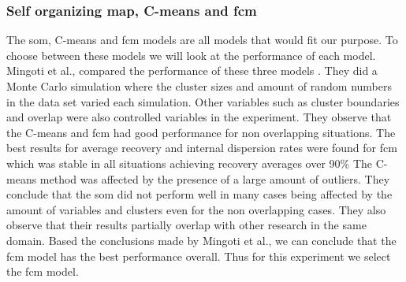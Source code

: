 \documentclass[../../main]{subfiles}
\begin{document}
\subsubsection{Self organizing map, C-means and \acrlong{fcm}}
\label{ch:topThreeModels}
The \acrfull{som}, C-means and \acrfull{fcm} models are all models that would fit our purpose. 
To choose between these models we will look at the performance of each model.
Mingoti et al., compared the performance of these three models \cite{Mingoti2006ComparingAlgorithms}.
They did a Monte Carlo simulation where the cluster sizes and amount of random numbers in the data set varied each simulation\cite{Mingoti2006ComparingAlgorithms}.
Other variables such as cluster boundaries and overlap were also controlled variables in the experiment.
They observe that the C-means and \acrlong{fcm} had good performance for non overlapping situations\cite{Mingoti2006ComparingAlgorithms}.
The best results for average recovery and internal dispersion rates were found for \acrlong{fcm} which was stable in all situations achieving recovery averages over 90\%\cite{Mingoti2006ComparingAlgorithms}
The C-means method was affected by the presence of a large amount of outliers.
They conclude that the \acrshort{som} did not perform well in many cases being affected by the amount of variables and clusters even for the non overlapping cases\cite{Mingoti2006ComparingAlgorithms}.
They also observe  that their results partially overlap with other research in the same domain.
\newline
Based the conclusions made by Mingoti et al., we can conclude that the \acrshort{fcm} model has the best performance overall.
Thus for this experiment we select the \acrshort{fcm} model.
\end{document}
